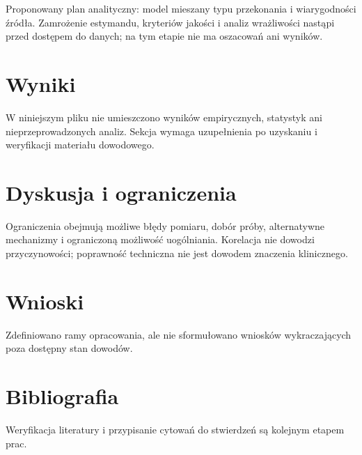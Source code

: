 \documentclass[11pt,a4paper]{article}
\begin{document}
Proponowany plan analityczny: model mieszany typu przekonania i wiarygodności źródła. Zamrożenie estymandu, kryteriów jakości i analiz wrażliwości nastąpi przed dostępem do danych; na tym etapie nie ma oszacowań ani wyników.

\section{Wyniki}

W niniejszym pliku nie umieszczono wyników empirycznych, statystyk ani nieprzeprowadzonych analiz. Sekcja wymaga uzupełnienia po uzyskaniu i weryfikacji materiału dowodowego.

\section{Dyskusja i ograniczenia}

Ograniczenia obejmują możliwe błędy pomiaru, dobór próby, alternatywne mechanizmy i ograniczoną możliwość uogólniania. Korelacja nie dowodzi przyczynowości; poprawność techniczna nie jest dowodem znaczenia klinicznego.

\section{Wnioski}

Zdefiniowano ramy opracowania, ale nie sformułowano wniosków wykraczających poza dostępny stan dowodów.

\section*{Bibliografia}

Weryfikacja literatury i przypisanie cytowań do stwierdzeń są kolejnym etapem prac.
\end{document}
